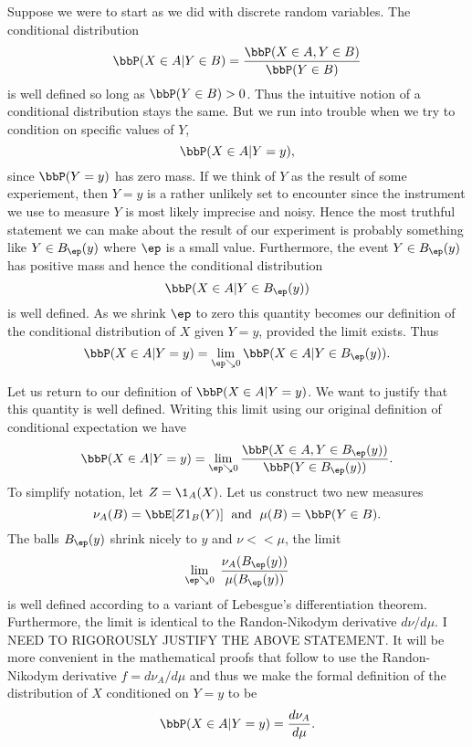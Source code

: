 \documentclass{report}
\begin{document}
Suppose we were to start as we did with discrete random variables.  The conditional distribution
\[
\bbP(X \in A | Y \in B) = \frac{\bbP(X \in A, Y \in B)}{\bbP(Y \in B)}
\]
is well defined so long as $\bbP(Y \in B) > 0$.  Thus the intuitive notion of a conditional distribution stays the same.  But we run into trouble when we try to condition on specific values of $Y$,
\[
\bbP(X \in A | Y = y),
\]
since $\bbP(Y = y)$ has zero mass.  If we think of $Y$ as the result of some experiement, then $Y = y$ is a rather unlikely set to encounter since the instrument we use to measure $Y$ is most likely imprecise and noisy.  Hence the most truthful statement we can make about the result of our experiment is probably something like $Y \in B_\ep(y)$ where $\ep$ is a small value.  Furthermore, the event $Y \in B_\ep(y)$ has positive mass and hence the conditional distribution
\[
\bbP(X \in A | Y \in B_\ep(y))
\]
is well defined.  As we shrink $\ep$ to zero this quantity becomes our definition of the conditional distribution of $X$ given $Y = y$, provided the limit exists.  Thus
\[
\bbP(X \in A | Y = y) = \lim_{\ep \searrow 0} \bbP(X \in A | Y \in B_\ep(y)).
\]

Let us return to our definition of $\bbP(X \in A | Y = y)$.  We want to justify that this quantity is well defined.  Writing this limit using our original definition of conditional expectation we have
\[
\bbP(X \in A | Y = y) = \lim_{\ep \searrow 0} \frac{\bbP(X \in A, Y \in B_\ep(y))}{\bbP(Y \in B_\ep(y))}.
\]
To simplify notation, let $Z = \1_A(X)$.  Let us construct two new measures
\[
\nu_A(B) = \bbE[Z 1_B(Y)] \; \textmd{ and } \; \mu(B) = \bbP(Y \in B).
\]
The balls $B_\ep(y)$ shrink nicely to $y$ and $\nu << \mu$, the limit
\[
\lim_{\ep \searrow 0} \; \frac{\nu_A(B_\ep(y))}{\mu(B_\ep(y))}
\]
is well defined according to a variant of Lebesgue's differentiation theorem.  Furthermore, the limit is identical to the Randon-Nikodym derivative $d\nu / d\mu$.  I NEED TO RIGOROUSLY JUSTIFY THE ABOVE STATEMENT.  It will be more convenient in the mathematical proofs that follow to use the Randon-Nikodym derivative $f = d \nu_A / d \mu$ and thus we make the formal definition of the distribution of $X$ conditioned on $Y = y$ to be
\[
\bbP(X \in A | Y = y) = \frac{ d \nu_A }{d \mu}.
\]

\begin{comment}
However, with both the limiting definition and the Radon-Nikodym derivative we need to make sure that we can recover the joint distribution of $X$ and $Y$ from our conditional distribution.
In particular, we need to show that
\[
\bbP(X \in A, Y \in B) = \int_B \bbP(X \in A | Y = y) \bbP^Y(dy).
\]
Here $\bbP^Y(dy)$ denotes integrating with respect to the distribution of $Y$.  We choose to approach this problem from the perspective of the Radon-Nikodym derivative.

This is a rather delicate point though.  The conditional expectation is defined $\bbP^Y$ almost surely.  When $Y$ is a continuous random variable there could be ``lots'' of points for which $\bbP(X \in A | Y = y)$ is undefined.
\end{comment}
\end{document}
